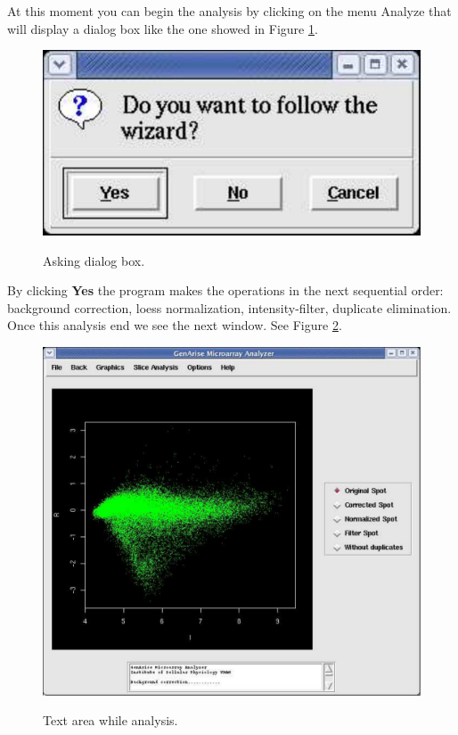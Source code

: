 \documentclass[12pt]{article}
\begin{document}
At this moment you can begin the analysis by clicking on the menu Analyze that will display a dialog box like the one showed in Figure \ref{fig21}.\\
\begin{figure}[h]
\begin{center}
\includegraphics[scale= 0.3]{./images/wizarddialog.pdf}\\
\caption{Asking dialog box.\label{fig21}}
\end{center}
\end{figure}

By clicking \textbf{Yes }the program makes the operations in the next sequential order: background correction, loess normalization, intensity-filter, duplicate elimination. Once this analysis end we see the next window. See Figure \ref{fig22}.\\

\begin{figure}[h]
\begin{center}
\includegraphics[scale= 0.3]{./images/wizardOriginal.pdf}\\
\caption{Text area while analysis. \label{fig22}}
\end{center}
\end{figure}
\end{document}
